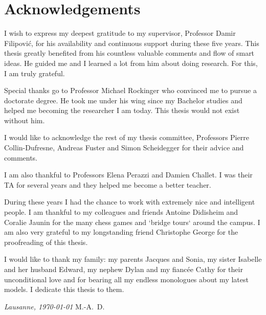 \chapter*{Acknowledgements}

I wish to express my deepest gratitude to my supervisor, Professor Damir Filipović, for his availability and continuous support during these five years. This thesis greatly benefited from his countless valuable comments and flow of smart ideas. He guided me and I learned a lot from him about doing research. For this, I am truly grateful.

Special thanks go to Professor Michael Rockinger who convinced me to pursue a doctorate degree. He took me under his wing since my Bachelor studies and helped me becoming the researcher I am today. This thesis would not exist without him.

I would like to acknowledge the rest of my thesis committee, Professors Pierre Collin-Dufresne, Andreas Fuster and Simon Scheidegger for their advice and comments.

I am also thankful to Professors Elena Perazzi and Damien Challet. I was their TA for several years and they helped me become a better teacher.

During these years I had the chance to work with extremely nice and intelligent people. I am thankful to my colleagues and friends Antoine Didisheim and Coralie Jaunin for the many chess games and `bridge tours` around the campus. I am also very grateful to my longstanding friend Christophe George for the proofreading of this thesis.

I would like to thank my family: my parents Jacques and Sonia, my sister Isabelle and her husband Edward, my nephew Dylan and my fiancée Cathy for their unconditional love and for bearing all my endless monologues about my latest models. I dedicate this thesis to them.

\bigskip
 
\noindent\textit{Lausanne, \today}
\hfill M.-A.~D.
